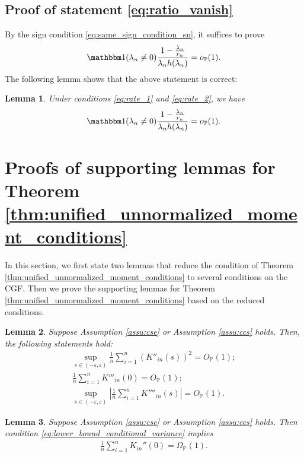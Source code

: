 \documentclass[12pt]{article}
\newtheorem{lemma}{Lemma}
\theoremstyle{definition}
\def\P{\mathbb{P}}
\def\P{\mathbb{P}}
\renewcommand{\P}{\mathbb{P}}							%
\newcommand{\indicator}{\mathbbm 1}						%
\begin{document}
\subsection{Proof of statement \eqref{eq:ratio_vanish}}

By the sign condition \eqref{eq:same_sign_condition_sn}, it suffices to prove 
\begin{align*}
	\indicator(\lambda_n\neq 0)\frac{1-\frac{\lambda_n}{r_n}}{\lambda_nh(\lambda_n)}=o_{\P}(1).
\end{align*}
The following lemma shows that the above statement is correct:
\begin{lemma}\label{lem:ratio_vanish}
	Under conditions \eqref{eq:rate_1} and \eqref{eq:rate_2}, we have 
	\begin{align*}
		\indicator(\lambda_n\neq 0)\frac{1-\frac{\lambda_n}{r_n}}{\lambda_nh(\lambda_n)}=o_{\P}(1).
	\end{align*}
\end{lemma}


\section{Proofs of supporting lemmas for Theorem \ref{thm:unified_unnormalized_moment_conditions}} \label{sec:lemma_proofs}

In this section, we first state two lemmas that reduce the condition of Theorem \ref{thm:unified_unnormalized_moment_conditions} to several conditions on the CGF. Then we prove the supporting lemmas for Theorem \ref{thm:unified_unnormalized_moment_conditions} based on the reduced conditions.

\begin{lemma}\label{lem:reduced_condition}
	Suppose Assumption \ref{assu:cse} or Assumption \ref{assu:ccs} holds. Then, the following statements hold:
	\begin{align}
		\sup_{s \in (-\varepsilon, \varepsilon)} \frac{1}{n}\sum_{i = 1}^n (K''_{in}(s))^2 = O_{\P}(1); \label{eq:second_cgf_derivative_bound} \\  
		\frac{1}{n}\sum_{i = 1}^n K'''_{in}(0) = O_{\P}(1); \label{eq:third_cgf_derivative_bound} \\  
		\sup_{s \in (-\varepsilon, \varepsilon)}\left|\frac{1}{n}\sum_{i = 1}^n K''''_{in}(s)\right| = O_{\P}(1). \label{eq:fourth_cgf_derivative_bound}
	\end{align}
\end{lemma}

\begin{lemma}\label{lem:reduced_variance_condition}
	Suppose Assumption \ref{assu:cse} or Assumption \ref{assu:ccs} holds. Then condition \eqref{eq:lower_bound_conditional_variance} implies 
	\begin{align}\label{eq:lower_bound_variance}
		\frac{1}{n}\sum_{i=1}^n K_{in}''(0)=\Omega_{\P}(1).
	\end{align}
\end{lemma}
\end{document}
